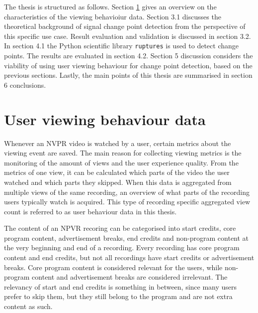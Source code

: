 The thesis is structured as follows. Section \ref{sec:data} gives an overview on the characteristics of the viewing behavioiur data. Section 3.1 discusses the theoretical background of signal change point detection from the perspective of this specific use case. Result evaluation and validation is discussed in section 3.2. In section 4.1 the Python scientific library \texttt{ruptures} is used to detect change points. The results are evaluated in section 4.2. Section 5 discussion considers the viability of using user viewing behaviour for change point detection, based on the previous sections. Lastly, the main points of this thesis are summarised in section 6 conclusions.

\section{User viewing behaviour data} \label{sec:data} %

Whenever an NVPR video is watched by a user, certain metrics about the viewing event are saved. %
The main reason for collecting viewing metrics is the monitoring of the amount of views and the user experience quality. From the metrics of one view, it can be calculated which parts of the video the user watched and which parts they skipped. When this data is aggregated from multiple views of the same recording, an overview of what parts of the recording users typically watch is acquired. This type of recording specific aggregated view count is referred to as user behaviour data in this thesis. %

The content of an NPVR recoring %
can be categorised into start credits, core program content, advertisement breaks, end credits and non-program content at the very beginning and end of a recording. Every recording has core program content and end credits, but not all recordings have start credits or advertisement breaks. Core program content is considered relevant for the users, while non-program content and advertisement breaks are considered irrelevant. The relevancy of start and end credits is something in between, since many users prefer to skip them, but they still belong to the program and are not extra content as such.

